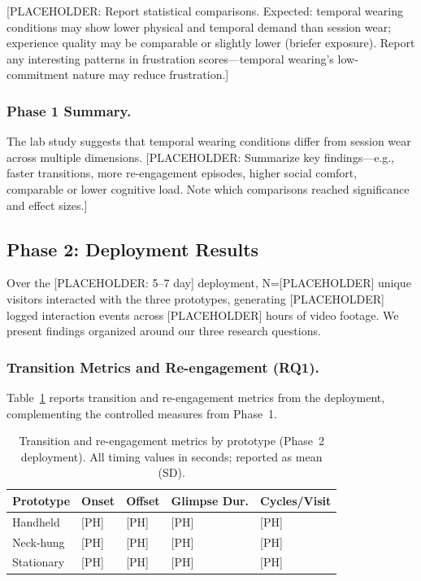[PLACEHOLDER: Report statistical comparisons. Expected: temporal wearing conditions may show lower physical and temporal demand than session wear; experience quality may be comparable or slightly lower (briefer exposure). Report any interesting patterns in frustration scores---temporal wearing's low-commitment nature may reduce frustration.]

\subsubsection{Phase 1 Summary.}
The lab study suggests that temporal wearing conditions differ from session wear across multiple dimensions. [PLACEHOLDER: Summarize key findings---e.g., faster transitions, more re-engagement episodes, higher social comfort, comparable or lower cognitive load. Note which comparisons reached significance and effect sizes.]

\subsection{Phase 2: Deployment Results}

Over the [PLACEHOLDER: 5--7 day] deployment, N=[PLACEHOLDER] unique visitors interacted with the three prototypes, generating [PLACEHOLDER] logged interaction events across [PLACEHOLDER] hours of video footage. We present findings organized around our three research questions.

\subsubsection{Transition Metrics and Re-engagement (RQ1).}
Table~\ref{tab:deploy-metrics} reports transition and re-engagement metrics from the deployment, complementing the controlled measures from Phase~1.

\begin{table}[t]
\centering
\caption{Transition and re-engagement metrics by prototype (Phase~2 deployment). All timing values in seconds; reported as mean (SD).}
\label{tab:deploy-metrics}
\begin{tabular}{p{2cm} p{1.5cm} p{1.5cm} p{1.5cm} p{1.5cm}}
\toprule
\textbf{Prototype} & \textbf{Onset} & \textbf{Offset} & \textbf{Glimpse Dur.} & \textbf{Cycles/Visit} \\
\midrule
Handheld & [PH] & [PH] & [PH] & [PH] \\
Neck-hung & [PH] & [PH] & [PH] & [PH] \\
Stationary & [PH] & [PH] & [PH] & [PH] \\
\bottomrule
\end{tabular}
\end{table}


